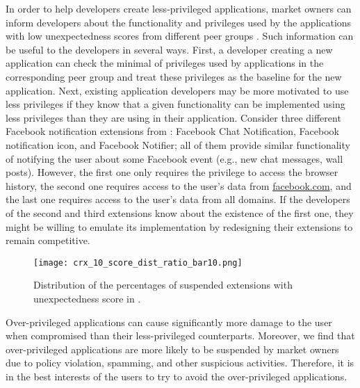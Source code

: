   In order to help developers 
create less-privileged applications, market owners can inform developers about the 
functionality and privileges used by the applications with low unexpectedness scores 
from different peer groups . Such information can be useful to the developers in several 
ways. First, a developer creating a new application can check the minimal of privileges 
used by applications in the corresponding peer group and treat these privileges 
as the baseline for the new application. Next, existing application developers 
may be more motivated to use less privileges if they know that a given functionality can be 
implemented using less privileges than they are using in their application. Consider three 
different Facebook notification extensions from \ChromeMarket{}: Facebook Chat Notification, Facebook notification icon, and 
Facebook Notifier; all of them provide similar functionality of notifying the user 
about some Facebook event (e.g., new chat messages, wall posts). However, the first 
one only requires the privilege to access the browser history, the second one requires access to 
the user's data from \url{facebook.com}, and the last one requires access to the user's data 
from all domains. If the developers of the second and third extensions 
know about the existence of the first one, they might be willing to emulate 
its implementation by redesigning their extensions to remain competitive.  

\begin{figure}[!htbp]
\centering
\texttt{[image: crx\_10\_score\_dist\_ratio\_bar10.png]}
\caption{Distribution of the percentages of suspended extensions with unexpectedness score in \ChromeMarket{}.}
\label{fig:banned_percentage_unexpectedness}
\end{figure}


 Over-privileged applications can 
cause significantly more damage to the user when compromised than their less-privileged counterparts. 
Moreover, we find  that over-privileged applications are more likely to be suspended by market owners 
due to policy violation, spamming, and other suspicious activities. Therefore, it is in the best interests 
of the users to try to avoid the over-privileged applications. 

